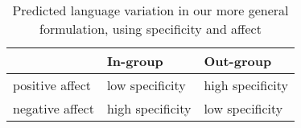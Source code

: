 \begin{table}[t]
    \centering
    \begin{tabular}{lll}
     \toprule
        \textbf{} & \textbf{In-group} & \textbf{Out-group} \\ \midrule
        positive affect & low specificity &  high specificity \\ \midrule
        negative affect & high specificity & low specificity \\ 
    \bottomrule
    \end{tabular}
    \caption{Predicted language variation in our more general formulation, using specificity and affect}
    \label{tab:ib}
\end{table}
